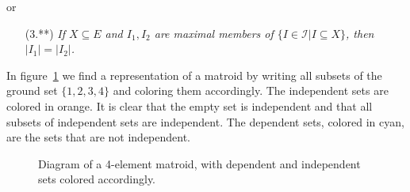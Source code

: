 or

\begin{enumerate}
\item[(3.**)] \textit{If $X \subseteq E$ and $I_1, I_2$ are maximal members of $\{ I \in \mathcal{I} | I \subseteq X \}$, then $|I_1| = |I_2|$.}
\end{enumerate}

\begin{exmp}
In  figure~\ref{fig:1234-matroid-independent-sets} we find a representation of a matroid by writing all subsets of the ground set $\{1,2,3,4\}$ and coloring them accordingly. The independent sets are colored in orange. It is clear that the empty set is independent and that all subsets of independent sets are independent. The dependent sets, colored in cyan, are the sets that are not independent.
\end{exmp}


\begin{figure}[h]

\begin{center}
\end{center}
\caption{Diagram of a 4-element matroid, with dependent and independent sets colored accordingly.}
\label{fig:1234-matroid-independent-sets}
\end{figure}


